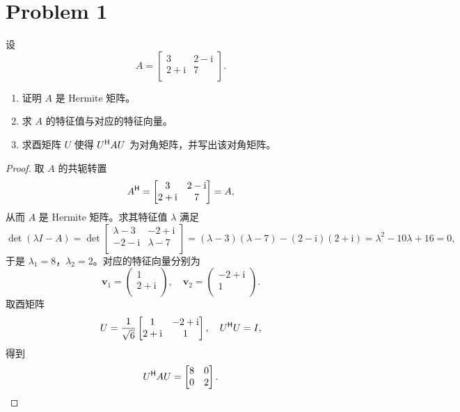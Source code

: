 \section*{Problem 1}

设 \[A = \begin{bmatrix}
    3 & 2 - \mathrm{i} \\
    2 + \mathrm{i} & 7 \\
\end{bmatrix}.\]

\begin{enumerate}
    \item 证明 $A$ 是 Hermite 矩阵。
    \item 求 $A$ 的特征值与对应的特征向量。
    \item 求酉矩阵 $U$ 使得 $U^{\mathsf{H}} AU$ 为对角矩阵，并写出该对角矩阵。
\end{enumerate}

\begin{proof}
    取 $A$ 的共轭转置
    \[
        A^{\mathsf{H}} = \begin{bmatrix}
            3 & 2 - \mathrm{i} \\
            2 + \mathrm{i} & 7 \\
        \end{bmatrix} = A,
    \]
    从而 $A$ 是 Hermite 矩阵。求其特征值 $\lambda$ 满足
    \[
        \det(\lambda I - A) = \det\begin{bmatrix}
            \lambda - 3 & -2 + \mathrm{i} \\
            -2 - \mathrm{i} & \lambda - 7 \\
        \end{bmatrix} = (\lambda - 3)(\lambda - 7) - (2 - \mathrm{i})(2 + \mathrm{i}) = \lambda^2 - 10\lambda + 16 = 0,
    \]
    于是 $\lambda_1 = 8$，$\lambda_2 = 2$。对应的特征向量分别为
    \[
        \bm{v}_1 = \begin{pmatrix}
            1 \\
            2 + \mathrm{i} \\
        \end{pmatrix},\quad \bm{v}_2 = \begin{pmatrix}
            -2 + \mathrm{i} \\
            1 \\
        \end{pmatrix}.
    \]
    取酉矩阵
    \[
        U = \frac{1}{\sqrt{6}} \begin{bmatrix}
            1 & -2 + \mathrm{i} \\
            2 + \mathrm{i} & 1 \\
        \end{bmatrix}, \quad U^{\mathsf{H}} U = I,
    \]
    得到
    \[
        U^{\mathsf{H}} A U = \begin{bmatrix}
            8 & 0 \\
            0 & 2 \\
        \end{bmatrix}.
    \]
\end{proof}

